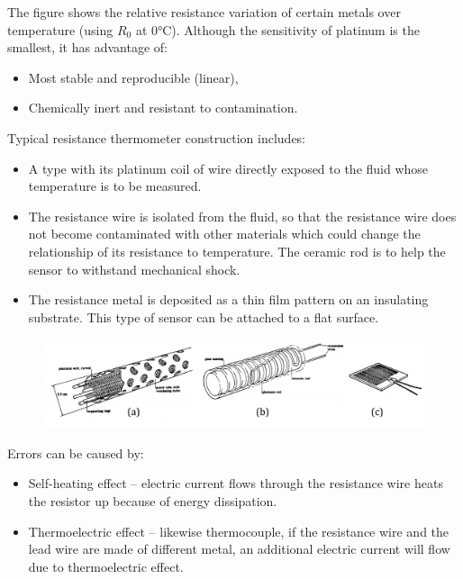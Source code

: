 \documentclass[class=report, crop=false, 12pt,a4paper]{standalone}
\begin{document}
The figure shows the relative resistance variation of certain metals over temperature (using $R_0$ at $\ang{0}$C). Although the sensitivity of platinum is the smallest, it has advantage of:
\begin{itemize}
  \item Most stable and reproducible (linear),
  \item Chemically inert and resistant to contamination.
\end{itemize}
Typical resistance thermometer construction includes:
\begin{itemize}
  \item A type with its platinum coil of wire directly exposed to the fluid whose temperature is to be measured.
  \item The resistance wire is isolated from the fluid, so that the resistance wire does not become contaminated with other materials which could change the relationship of its resistance to temperature. The ceramic rod is to help the sensor to withstand mechanical shock.
  \item The resistance metal is deposited as a thin film pattern on an insulating substrate. This type of sensor can be attached to a flat surface.
\end{itemize}
\begin{figure}[H]
  \centering
  \includegraphics[width = 1\textwidth]{../img/Mdiagram69.png}
\end{figure}
Errors can be caused by:
\begin{itemize}
  \item Self-heating effect – electric current flows through the resistance wire heats the resistor up because of energy dissipation.
  \item Thermoelectric effect – likewise thermocouple, if the resistance wire and the lead wire are made of different metal, an additional electric current will flow due to thermoelectric effect.
\end{itemize}
\end{document}
